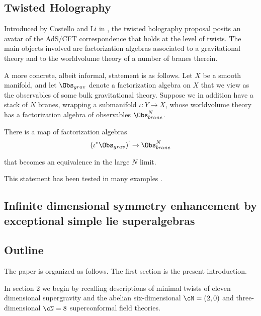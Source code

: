 \subsection{Twisted Holography}
Introduced by Costello and Li in \cite{CLsugra}, the twisted holography proposal posits an avatar of the AdS/CFT correspondence that holds at the level of twists. The main objects involved are factorization algebras associated to a gravitational theory and to the worldvolume theory of a number of branes therein.

A more concrete, albeit informal, statement is as follows. Let $X$ be a smooth manifold, and let $\Obs_{grav}$ denote a factorization algebra on $X$ that we view as the observables of some bulk gravitational theory. Suppose we in addition have a stack of $N$ branes, wrapping a submanifold $\iota: Y\to X$, whose worldvolume theory has a factorization algebra of observables $\Obs^{N}_{brane}$.

\begin{expect}
  There is a map of factorization algebras
  \[
        (\iota^{*}\Obs_{grav})^{!}\to \Obs^{N}_{brane}
  \]

      that becomes an equivalence in the large $N$ limit.
\end{expect}

    This statement has been tested in many examples \cite{}.


\subsection{Infinite dimensional symmetry enhancement by exceptional simple lie superalgebras}

\subsection{Outline}

The paper is organized as follows. The first section is the present introduction.

In section 2 we begin by recalling descriptions of minimal twists of eleven dimensional supergravity \cite{} and the abelian six-dimensional $\cN=(2,0)$ \cite{} and three-dimensional $\cN=8$ \cite{} superconformal field theories.

%
